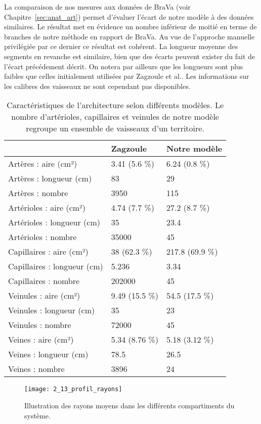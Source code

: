  La comparaison de nos mesures aux données de BraVa (voir Chapitre~\ref{sec:anat_art}) permet d'évaluer l'écart de notre modèle à des données similaires. Le résultat met en évidence un nombre inférieur de moitié en terme de branches de notre méthode en rapport de BraVa. Au vue de l'approche manuelle privilégiée par ce dernier ce résultat est cohérent. La longueur moyenne des segments en revanche est similaire, bien que des écarts peuvent exister du fait de l'écart précédement décrit. On notera par ailleurs que les longueurs sont plus faibles que celles initialement utilisées par Zagzoule et al.. Les informations sur les calibres des vaisseaux ne sont cependant pas disponibles. \\

\begin{table}
\caption{Caractéristiques de l'architecture selon différents modèles. Le nombre d'artérioles, capillaires et veinules de notre modèle regroupe un ensemble de vaisseaux d'un territoire.}
\label{tab:tab_profil_rayons}
\begin{tabular}[!t]{l|l l}
\centering
      & Zagzoule & Notre modèle  \\
\hline
   Artères : aire (cm²) & 3.41 (5.6 \%)&  6.24  (0.8 \%) \\
   Artères : longueur (cm) & 83 &  29 \\
   Artères : nombre & 3950 &  115 \\
   Artérioles : aire (cm²) & 4.74 (7.7 \%)&  27.2  (8.7 \%)\\
   Artérioles : longueur (cm) & 35 &  23.4 \\
   Artérioles : nombre & 35000 &  45 \\
   Capillaires : aire (cm²) & 38  (62.3 \%)&  217.8  (69.9 \%)\\
   Capillaires : longueur (cm) & 5.236 &  3.34 \\
   Capillaires : nombre & 202000 &  45 \\
   Veinules : aire (cm²) & 9.49 (15.5 \%)& 54.5 (17.5 \%)\\
   Veinules : longueur (cm) & 35 &  23 \\
   Veinules : nombre & 72000 &  45 \\
   Veines : aire (cm²) & 5.34  (8.76 \%)& 5.18 (3.12 \%)\\
   Veines : longueur (cm) & 78.5 &  26.5 \\
   Veines : nombre & 3896 &  24 \\
\hline

\end{tabular}
\end{table}
\begin{figure}[!t]
\centering
\texttt{[image: 2\_13\_profil\_rayons]}
\caption{Illustration des rayons moyens dans les différents compartiments du système.}
\label{fig:2_13_profil_rayons}	
\end{figure}	


